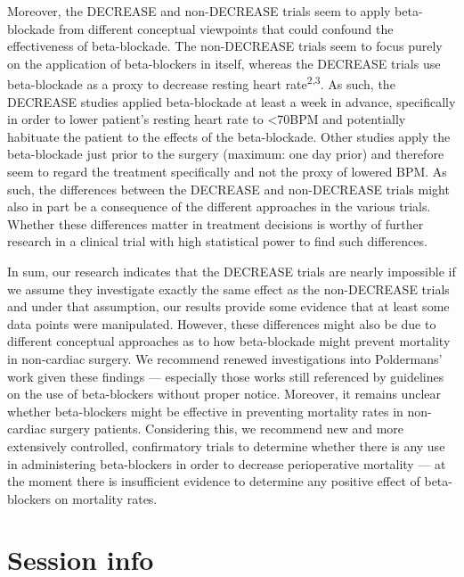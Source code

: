 \documentclass[]{article}
\begin{document}
Moreover, the DECREASE and non-DECREASE trials seem to apply
beta-blockade from different conceptual viewpoints that could confound
the effectiveness of beta-blockade. The non-DECREASE trials seem to
focus purely on the application of beta-blockers in itself, whereas the
DECREASE trials use beta-blockade as a proxy to decrease resting heart
rate\textsuperscript{2,3}. As such, the DECREASE studies applied
beta-blockade at least a week in advance, specifically in order to lower
patient's resting heart rate to \textless{}70BPM and potentially
habituate the patient to the effects of the beta-blockade. Other studies
apply the beta-blockade just prior to the surgery (maximum: one day
prior) and therefore seem to regard the treatment specifically and not
the proxy of lowered BPM. As such, the differences between the DECREASE
and non-DECREASE trials might also in part be a consequence of the
different approaches in the various trials. Whether these differences
matter in treatment decisions is worthy of further research in a
clinical trial with high statistical power to find such differences.

In sum, our research indicates that the DECREASE trials are nearly
impossible if we assume they investigate exactly the same effect as the
non-DECREASE trials and under that assumption, our results provide some
evidence that at least some data points were manipulated. However, these
differences might also be due to different conceptual approaches as to
how beta-blockade might prevent mortality in non-cardiac surgery. We
recommend renewed investigations into Poldermans' work given these
findings --- especially those works still referenced by guidelines on
the use of beta-blockers without proper notice. Moreover, it remains
unclear whether beta-blockers might be effective in preventing mortality
rates in non-cardiac surgery patients. Considering this, we recommend
new and more extensively controlled, confirmatory trials to determine
whether there is any use in administering beta-blockers in order to
decrease perioperative mortality --- at the moment there is insufficient
evidence to determine any positive effect of beta-blockers on mortality
rates.

\section{Session info}\label{session-info}
\end{document}
